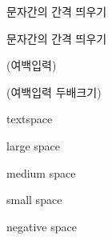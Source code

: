 \documentclass[ aspectratio=149,  14pt,blue,xcolor=pdftex,dvipsnames,table,handout,notes]{beamer}
\begin{document}
		\begin{frame}[t,allowframebreaks]{문자간의 간격 띄우기}

			\begin{block} {문자간의 간격 띄우기}
			\begin{description}[1234567890]
			\item [$\sim$] 
			\item [\textbackslash hspace \{ 2cm \} ]
			\item [\textbackslash quad] 	(여백입력)\\
			\item [\textbackslash qquad] 	(여백입력 두배크기)\\
			\item [\textbackslash  ]textspace \\
			\item [\textbackslash ;] large space \\
			\item [\textbackslash \(>\)] medium space \\
			\item [\textbackslash ,] small space \\
			\item [\textbackslash !] negative space \\
			\end{description}

			\end{block}

		
		\end{frame}
\end{document}
